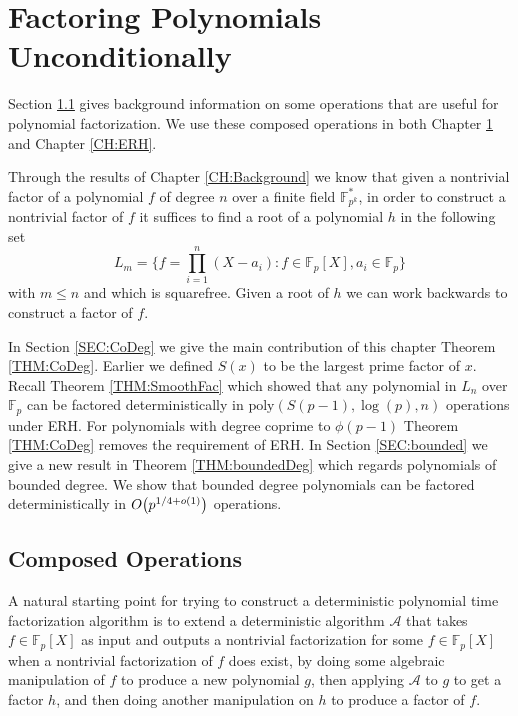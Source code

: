 \documentclass{article}
\let\originalleft\left
\let\originalright\right
\renewcommand{\left}{\mathopen{}\mathclose\bgroup\originalleft}
\renewcommand{\right}{\aftergroup\egroup\originalright}
\let\chapter\section
\theoremstyle{plain}
\theoremstyle{definition}
\def\Fp {{ \mathbb{F} _ {p} }}
\def\FPE {{ \mathbb{F}^* _ {p^k} }}
\def\poly {{ \mathrm{poly} }}
\begin{document}
%
%
\newpage
\chapter{Factoring Polynomials Unconditionally}
\label{CH:uncond}
%
%
    Section \ref{SEC:CompOps} gives background information on some operations that are useful for polynomial factorization. We use these composed operations in both Chapter \ref{CH:uncond} and Chapter \ref{CH:ERH}. 
		
	  Through the results of Chapter \ref{CH:Background} we know that given a nontrivial factor of a polynomial $f$ of degree $n$ over a finite field $\FPE$, in order to construct a nontrivial factor of $f$ it suffices to find a root of a polynomial $h$ in the following set
		\[ L_m=\{ f=\prod_{i=1}^n{(X-a_i)} : f\in \Fp[X], a_i \in \Fp \} \]
		\noindent with $m \leq n$ and which is squarefree. Given a root of $h$ we can work backwards to construct a factor of $f$. 
		
		In Section \ref{SEC:CoDeg} we give the main contribution of this chapter Theorem \ref{THM:CoDeg}. Earlier we defined $S(x)$ to be the largest prime factor of $x$. Recall Theorem \ref{THM:SmoothFac} which showed that any polynomial in $L_n$ over $\Fp$ can be factored deterministically in $\poly(S(p-1),\log(p),n)$ operations under ERH. For polynomials with degree coprime to $\phi(p-1)$ Theorem \ref{THM:CoDeg} removes the requirement of ERH. In Section \ref{SEC:bounded} we give a new result in Theorem \ref{THM:boundedDeg} which regards polynomials of bounded degree. We show that bounded degree polynomials can be factored deterministically in $O\left( p^{1/4+o(1)} \right)$ operations. 
		
    \subsection{Composed Operations}
		\label{SEC:CompOps}
		
    A natural starting point for trying to construct a deterministic polynomial time factorization algorithm is to extend a deterministic algorithm $\mathcal{A}$ that takes $f \in \Fp[X]$ as input and outputs a nontrivial factorization for some $f \in \Fp[X]$ when a nontrivial factorization of $f$ does exist, by doing some algebraic manipulation of $f$ to produce a new polynomial $g$, then applying $\mathcal{A}$ to $g$ to get a factor $h$, and then doing another manipulation on $h$ to produce a factor of $f$. 
		
\end{document}
